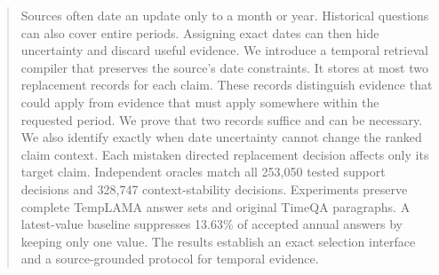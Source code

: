 \begin{abstract}
Sources often date an update only to a month or year.
Historical questions can also cover entire periods.
Assigning exact dates can then hide uncertainty and discard useful evidence.
We introduce a temporal retrieval compiler that preserves the source's date constraints.
It stores at most two replacement records for each claim.
These records distinguish evidence that could apply from evidence that must apply somewhere within the requested period.
We prove that two records suffice and can be necessary.
We also identify exactly when date uncertainty cannot change the ranked claim context.
Each mistaken directed replacement decision affects only its target claim.
Independent oracles match all 253,050 tested support decisions and 328,747 context-stability decisions.
Experiments preserve complete TempLAMA answer sets and original TimeQA paragraphs.
A latest-value baseline suppresses 13.63\% of accepted annual answers by keeping only one value.
The results establish an exact selection interface and a source-grounded protocol for temporal evidence.
\end{abstract}
